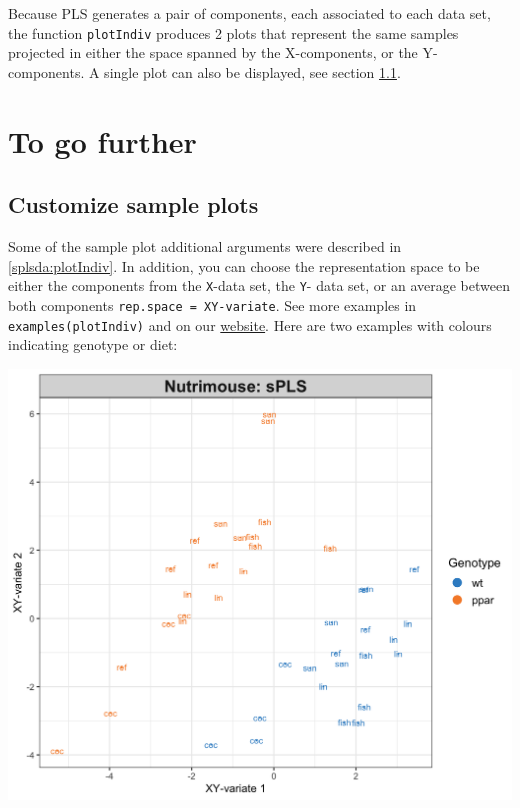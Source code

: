 \documentclass[]{book}
\newenvironment{Shaded}{\begin{snugshade}}{\end{snugshade}}
\newcommand{\KeywordTok}[1]{\textcolor[rgb]{0.13,0.29,0.53}{\textbf{#1}}}
\newcommand{\DataTypeTok}[1]{\textcolor[rgb]{0.13,0.29,0.53}{#1}}
\newcommand{\StringTok}[1]{\textcolor[rgb]{0.31,0.60,0.02}{#1}}
\newcommand{\OtherTok}[1]{\textcolor[rgb]{0.56,0.35,0.01}{#1}}
\newcommand{\OperatorTok}[1]{\textcolor[rgb]{0.81,0.36,0.00}{\textbf{#1}}}
\newcommand{\NormalTok}[1]{#1}
\theoremstyle{definition}
\theoremstyle{definition}
\theoremstyle{definition}
\theoremstyle{remark}
\begin{document}
Because PLS generates a pair of components, each associated to each data
set, the function \texttt{plotIndiv} produces 2 plots that represent the
same samples projected in either the space spanned by the X-components,
or the Y-components. A single plot can also be displayed, see section
\ref{pls:plotIndiv}.

\section{To go further}\label{pls-tgf}

\subsection{Customize sample plots}\label{pls:plotIndiv}

Some of the sample plot additional arguments were described in
\ref{splsda:plotIndiv}. In addition, you can choose the representation
space to be either the components from the \texttt{X}-data set, the
\texttt{Y}- data set, or an average between both components
\texttt{rep.space\ =\ \textquotesingle{}XY-variate\textquotesingle{}}.
See more examples in \texttt{examples(plotIndiv)} and on our
\href{http://mixomics.org/graphics/sample-plots/}{website}. Here are two
examples with colours indicating genotype or diet:

\begin{Shaded}
\end{Shaded}

\begin{center}\includegraphics[width=0.5\linewidth]{Figures/unnamed-chunk-3-1} \end{center}
\end{document}
